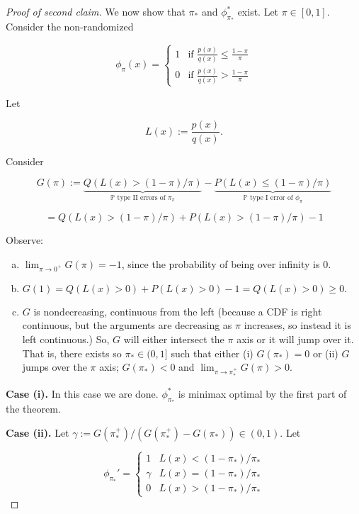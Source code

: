 \begin{proof}[Proof of second claim]

We now show that \(\pi_*\) and \(\phi_{\pi_*}^*\) exist. Let \(\pi \in [0,1]\). Consider the non-randomized

\[
\phi_\pi (x) = \begin{cases}
1 & \text{if } \frac{p(x)}{q(x)} \leq \frac{1-\pi}{\pi} \\
0 & \text{if } \frac{ p(x)}{q(x)} > \frac{1 - \pi}{\pi}
\end{cases}
\]

Let

\[
L(x) := \frac{ p(x)}{q(x)}.
\]

Consider 

\[
G(\pi) := \underbrace{Q(L(x) > (1 - \pi)/\pi)}_{\mathbb{P} \text{ type II errors of } \pi_\pi} - \underbrace{P(L(x) \leq (1- \pi)/\pi)}_{\mathbb{P}\text{ type I error of } \phi_\pi}
\]

\[
= Q(L(x) > (1 - \pi)/\pi) + P(L(x) > (1- \pi)/\pi) - 1
\]

Observe:

\begin{enumerate}[(a)]

\item \(\lim_{\pi \to 0^+} G(\pi) = -1\), since the probability of being over infinity is 0.

\item \(G(1) = Q(L(x) >0) + P(L(x) > 0) - 1  = Q(L(x) >0) \geq 0.\)

\item \(G\) is nondecreasing, continuous from the left (because a CDF is right continuous, but the arguments are decreasing as \(\pi\) increases, so instead it is left continuous.) So, \(G\) will either intersect the \(\pi\) axis or it will jump over it. That is, there exists so \(\pi_* \in (0,1]\) such that either (i) \(G(\pi_*) = 0\) or (ii) \( G\) jumps over the \(\pi\) axis; \(G(\pi_*) < 0\) and \(\lim_{\pi \to \pi_*^+} G(\pi) > 0\).

\end{enumerate}

\textbf{Case (i).} In this case we are done. \(\phi_{\pi_*}^*\) is minimax optimal by the first part of the theorem.

\textbf{Case (ii).} Let \(\gamma := G(\pi_*^+) / (G(\pi_*^+) - G(\pi_*)) \in (0, 1)\). Let 

\[
\phi_{\pi_*}' = \begin{cases}
1 & L(x) < (1 - \pi_*)/ \pi_* \\
\gamma & L(x) = (1 - \pi_*)/\pi_* \\
0 & L(x) > (1 - \pi_*)/ \pi_* 
\end{cases}
\]


\end{proof}
